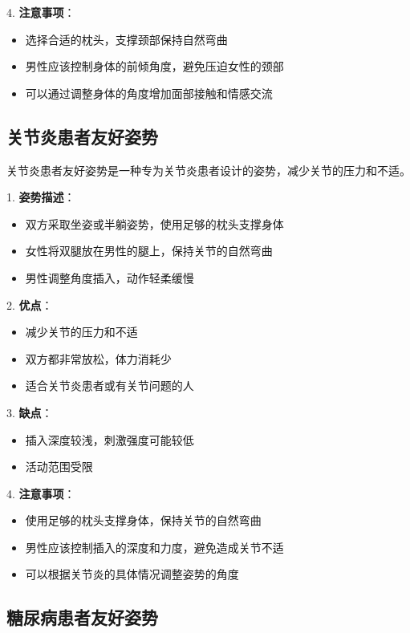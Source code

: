 \documentclass[12pt,UTF8]{ctexbook}
\begin{document}
4. \textbf{注意事项}：
  \begin{itemize}
  \item 选择合适的枕头，支撑颈部保持自然弯曲
  \item 男性应该控制身体的前倾角度，避免压迫女性的颈部
  \item 可以通过调整身体的角度增加面部接触和情感交流
  \end{itemize}

\subsection{关节炎患者友好姿势}

关节炎患者友好姿势是一种专为关节炎患者设计的姿势，减少关节的压力和不适。

1. \textbf{姿势描述}：
  \begin{itemize}
  \item 双方采取坐姿或半躺姿势，使用足够的枕头支撑身体
  \item 女性将双腿放在男性的腿上，保持关节的自然弯曲
  \item 男性调整角度插入，动作轻柔缓慢
  \end{itemize}

2. \textbf{优点}：
  \begin{itemize}
  \item 减少关节的压力和不适
  \item 双方都非常放松，体力消耗少
  \item 适合关节炎患者或有关节问题的人
  \end{itemize}

3. \textbf{缺点}：
  \begin{itemize}
  \item 插入深度较浅，刺激强度可能较低
  \item 活动范围受限
  \end{itemize}

4. \textbf{注意事项}：
  \begin{itemize}
  \item 使用足够的枕头支撑身体，保持关节的自然弯曲
  \item 男性应该控制插入的深度和力度，避免造成关节不适
  \item 可以根据关节炎的具体情况调整姿势的角度
  \end{itemize}

\subsection{糖尿病患者友好姿势}
\end{document}
